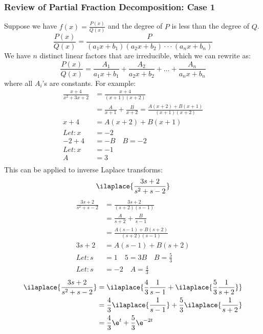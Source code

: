\documentclass{math}
\begin{document}
\subsubsection*{Review of Partial Fraction Decomposition: Case 1}
Suppose we have \( f(x) = \frac{P(x)}{Q(x)} \) and the degree
of \( P \) is less than the degree of \( Q \).
\[ \frac{P(x)}{Q(x)} =
  \frac{P}{(a_1x+b_1)(a_2x+b_2)\cdot\cdot\cdot(a_nx+b_n)} \]
We have \( n \) distinct linear factors that are irreducible, which we can
rewrite as:
\[ \frac{P(x)}{Q(x)} =
  \frac{A_1}{a_1x+b_1}+\frac{A_2}{a_2x+b_2}+\dots+\frac{A_n}{a_nx+b_n} \]
where all \( A_i \)'s are constants. For example:
\begin{align*}
  \frac{x+4}{x^2+3x+2} &= \frac{x+4}{(x+1)(x+2)} \\
  &= \frac{A}{x+1}+\frac{B}{x+2} = \frac{A(x+2)+B(x+1)}{(x+1)(x+2)} \\
  x+4 &= A(x+2)+B(x+1) \\
  Let: x &= -2 \\
  -2+4 &= -B \quad B = -2 \\
  Let: x &= -1 \\
  A &= 3 \\
\end{align*}
This can be applied to inverse Laplace transforms:
\[ \ilaplace{\frac{3s+2}{s^2+s-2}} \]
\begin{align*}
  \frac{3s+2}{s^2+s-2} &= \frac{3s+2}{(s+2)(s-1)} \\
  &= \frac{A}{s+2}+\frac{B}{s-1} \\
  &= \frac{A(s-1)+B(s+2)}{(s+2)(s-1)} \\
  3s+2 &= A(s-1)+B(s+2) \\
  Let: s &= 1 \quad 5 = 3B \quad B = \frac{5}{3} \\
  Let: s &= -2 \quad A = \frac{4}{3}
\end{align*}
\begin{align*}
  \ilaplace{\frac{3s+2}{s^2+s-2}} &=
    \ilaplace{\frac{4}{3}\frac{1}{s-1}+\ilaplace{\frac{5}{3}\frac{1}{s+2}}} \\
  &= \frac{4}{3}\ilaplace{\frac{1}{s-1}}+\frac{5}{3}\ilaplace{\frac{1}{s+2}} \\
  &= \frac{4}{3}\e^t+\frac{5}{3}\e^{-2t}
\end{align*}
\end{document}
